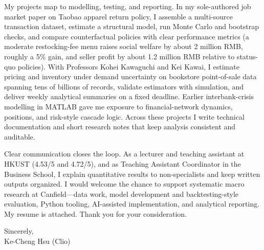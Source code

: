 \documentclass[11pt,letterpaper]{article}
\begin{document}
My projects map to modelling, testing, and reporting. In my sole-authored job market paper on Taobao apparel return policy, I assemble a multi-source transaction dataset, estimate a structural model, run Monte Carlo and bootstrap checks, and compare counterfactual policies with clear performance metrics (a moderate restocking-fee menu raises social welfare by about 2 million RMB, roughly a 5\% gain, and seller profit by about 1.2 million RMB relative to status-quo policies). With Professors Kohei Kawaguchi and Kei Kawai, I estimate pricing and inventory under demand uncertainty on bookstore point-of-sale data spanning tens of billions of records, validate estimators with simulation, and deliver weekly analytical summaries on a fixed deadline. Earlier interbank-crisis modelling in MATLAB gave me exposure to financial-network dynamics, positions, and risk-style cascade logic. Across these projects I write technical documentation and short research notes that keep analysis consistent and auditable.

Clear communication closes the loop. As a lecturer and teaching assistant at HKUST (4.53/5 and 4.72/5), and as Teaching Assistant Coordinator in the Business School, I explain quantitative results to non-specialists and keep written outputs organized. I would welcome the chance to support systematic macro research at Canfield---data work, model development and backtesting-style evaluation, Python tooling, AI-assisted implementation, and analytical reporting. My resume is attached. Thank you for your consideration.

\vspace{0.4em}
Sincerely,\\[0.35em]
Ke-Cheng Hsu (Clio)
\end{document}
